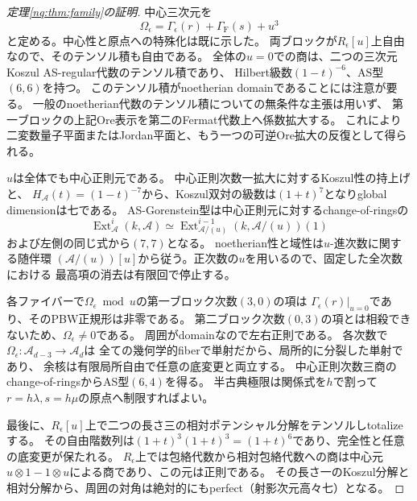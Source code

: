 \begin{proof}[定理\ref{nq:thm:family}の証明]
中心三次元を
\begin{equation}
 \Omega_\epsilon=\Gamma_\epsilon(r)+\Gamma_{\mathrm F}(s)+u^3
 \label{nq:eq:total-center}
\end{equation}
と定める。中心性と原点への特殊化は既に示した。
両ブロックが$R_\epsilon[u]$上自由なので、そのテンソル積も自由である。
全体の$u=0$での商は、二つの三次元Koszul AS-regular代数のテンソル積であり、
Hilbert級数$(1-t)^{-6}$、AS型$(6,6)$を持つ。
このテンソル積がnoetherian domainであることには注意が要る。
一般のnoetherian代数のテンソル積についての無条件な主張は用いず、
第一ブロックの上記Ore表示を第二のFermat代数上へ係数拡大する。
これにより二変数量子平面またはJordan平面と、もう一つの可逆Ore拡大の反復として得られる。

$u$は全体でも中心正則元である。
中心正則次数一拡大に対するKoszul性の持上げ
\cite[Theorem 2.6, Remark 2.8]{LBSVNE12}と、
$H_{\mathcal A}(t)=(1-t)^{-7}$から、Koszul双対の級数は$(1+t)^7$となりglobal dimensionは七である。
AS-Gorenstein型は中心正則元に対するchange-of-ringsの
\begin{equation}
 \operatorname{Ext}_{\mathcal A}^{i}(k,\mathcal A)
 \simeq\operatorname{Ext}_{\mathcal A/(u)}^{i-1}
             (k,\mathcal A/(u))(1)
\end{equation}
および左側の同じ式から$(7,7)$となる。
noetherian性と域性は$u$-進次数に関する随伴環
$(\mathcal A/(u))[u]$から従う。正次数の$u$を用いるので、固定した全次数における
最高項の消去は有限回で停止する。

各ファイバーで$\Omega_\epsilon\bmod u$の第一ブロック次数$(3,0)$の項は
$\Gamma_\epsilon(r)|_{u=0}$であり、そのPBW正規形は非零である。
第二ブロック次数$(0,3)$の項とは相殺できないため、$\Omega_\epsilon\ne0$である。
周囲がdomainなので左右正則である。
各次数で$\Omega_\epsilon:\mathcal A_{d-3}\to\mathcal A_d$は
全ての幾何学的fiberで単射だから、局所的に分裂した単射であり、
余核は有限局所自由で任意の底変更と両立する。
中心正則次数三商のchange-of-ringsからAS型$(6,4)$を得る。
半古典極限は関係式を$h$で割って$r=h\lambda,s=h\mu$の原点へ制限すればよい。

最後に、$R_\epsilon[u]$上で二つの長さ三の相対ポテンシャル分解をテンソルしtotalizeする。
その自由階数列は$(1+t)^3(1+t)^3=(1+t)^6$であり、完全性と任意の底変更が保たれる。
$R_\epsilon$上では包絡代数から相対包絡代数への商は中心元
$u\otimes1-1\otimes u$による商であり、この元は正則である。
その長さ一のKoszul分解と相対分解から、周囲の対角は絶対的にもperfect（射影次元高々七）となる。
\end{proof}

